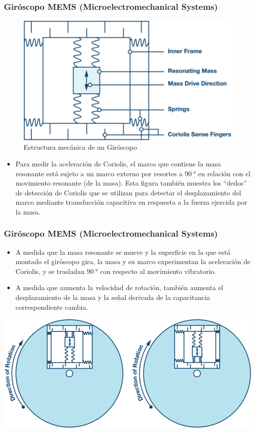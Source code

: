 \begin{frame}
    \frametitle{Giróscopo MEMS (Microelectromechanical Systems)}
    \scriptsize

    \begin{figure}[!h]
        \centering
        \includegraphics[width=0.5\columnwidth]{images/gyroscope_mems_structure.png}
        \caption{Estructura mecánica de un Giróscopo}
    \end{figure}

    \begin{itemize}
        \item Para medir la aceleración de Coriolis, el marco que contiene la masa resonante está sujeto a un marco externo por resortes a $\SI{90}{\degree}$ en relación con el movimiento resonante (de la masa). Esta figura también muestra los ``dedos'' de detección de Coriolis que se utilizan para detectar el desplazamiento del marco mediante transducción capacitiva en respuesta a la fuerza ejercida por la masa.
    \end{itemize}
\end{frame}

\begin{frame}
    \frametitle{Giróscopo MEMS (Microelectromechanical Systems)}
    
        
    \begin{itemize}
        \item A medida que la masa resonante se mueve y la superficie en la que está montado el giróscopo gira, la masa y su marco experimentan la aceleración de Coriolis, y se trasladan $\SI{90}{\degree}$ con respecto al movimiento vibratorio.
        
        \item A medida que aumenta la velocidad de rotación, también aumenta el desplazamiento de la masa y la señal derivada de la capacitancia correspondiente cambia.
    \end{itemize}
    
    \begin{center}
        \includegraphics[width=0.5\columnwidth]{images/gyroscope_mems_3.png}
    \end{center}

\end{frame}

